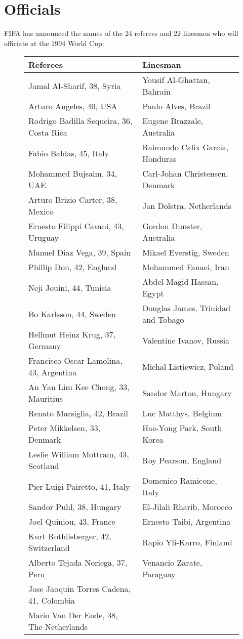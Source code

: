 \chapter{Officials}
\newline
\newline
FIFA has announced the names of the 24 referees and 22 linesmen who will officiate at the 1994 World Cup:
\begin{figure}[H]
\begin{tabular}{l l}
Referees & Linesman \\ \hline
Jamal Al-Sharif, 38, Syria & Yousif Al-Ghattan, Bahrain \\
Arturo Angeles, 40, USA & Paulo Alves, Brazil \\
Rodrigo Badilla Sequeira, 36, Costa Rica & Eugene Brazzale, Australia \\
Fabio Baldas, 45, Italy & Raimundo Calix Garcia, Honduras \\
Mohammed Bujsaim, 34, UAE  & Carl-Johan Christensen, Denmark \\
Arturo Brizio Carter, 38, Mexico & Jan Dolstra, Netherlands \\
Ernesto Filippi Cavani, 43, Uruguay & Gordon Dunster, Australia \\
Manuel Diaz Vega, 39, Spain & Mikael Everstig, Sweden \\
Phillip Don, 42, England & Mohammed Fanaei, Iran \\
Neji Jouini, 44, Tunisia & Abdel-Magid Hassan, Egypt \\
Bo Karlsson, 44, Sweden & Douglas James, Trinidad and Tobago \\
Hellmut Heinz Krug, 37, Germany & Valentine Ivanov, Russia \\
Francisco Oscar Lamolina, 43, Argentina & Michal Listiewicz, Poland \\
An Yan Lim Kee Chong, 33, Mauritius & Sandor Marton, Hungary \\
Renato Marsiglia, 42, Brazil & Luc Matthys, Belgium \\
Peter Mikkelsen, 33, Denmark & Hae-Yong Park, South Korea \\
Leslie William Mottram, 43, Scotland & Roy Pearson, England \\
Pier-Luigi Pairetto, 41, Italy  & Domenico Ramicone, Italy \\
Sandor Puhl, 38, Hungary & El-Jilali Rharib, Morocco \\
Joel Quiniou, 43, France & Ernesto Taibi, Argentina \\
Kurt Rothlisberger, 42, Switzerland & Rapio Yli-Karro, Finland \\
Alberto Tejada Noriega, 37, Peru & Venancio Zarate, Paraguay \\
Jose Jaoquin Torres Cadena, 41, Colombia & \\
Mario Van Der Ende, 38, The Netherlands & \\
\end{tabular}
\end{figure}
